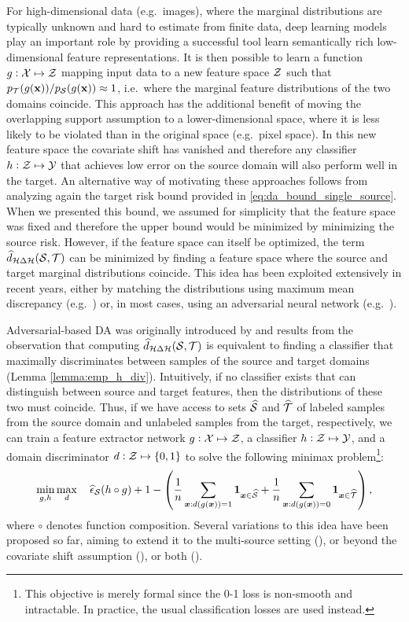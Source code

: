 For high-dimensional data (e.g.\ images), where the marginal distributions are typically unknown and hard to estimate from finite data, deep learning models play an important role by providing a successful tool learn semantically rich low-dimensional feature representations. It is then possible to learn a function $g:{\mathcal{X}} \mapsto {\mathcal{Z}}$ mapping input data to a new feature space ${\mathcal{Z}}$ such that $p_{{\mathcal{T}}}(g({\mathbf{x}}))/p_{{\mathcal{S}}}(g({\mathbf{x}})) \approx 1$, i.e.\ where the marginal feature distributions of the two domains coincide. This approach has the additional benefit of moving the overlapping support assumption to a lower-dimensional space, where it is less likely to be violated than in the original space (e.g.\ pixel space). In this new feature space the covariate shift has vanished and therefore any classifier $h:{\mathcal{Z}} \mapsto {\mathcal{Y}}$ that achieves low error on the source domain will also perform well in the target. An alternative way of motivating these approaches follows from analyzing again the target risk bound provided in \eqref{eq:da_bound_single_source}. When we presented this bound, we assumed for simplicity that the feature space was fixed and therefore the upper bound would be minimized by minimizing the source risk. However, if the feature space can itself be optimized, the term $\widehat{d}_{{\mathcal{H}} \Delta {\mathcal{H}}}({\mathcal{S}}, {\mathcal{T}})$ can be minimized by finding a feature space where the source and target marginal distributions coincide. This idea has been exploited extensively in recent years, either by matching the distributions using maximum mean discrepancy (e.g.\ \citet{Long2015,Guo2018}) or, in most cases, using an adversarial neural network (e.g.\ \citet{Zhao2018,Ganin2015,Pei2018,Sebag2019}).

Adversarial-based DA was originally introduced by \citet{Ganin2015} and results from the observation that
computing $\widehat{d}_{{\mathcal{H}} \Delta {\mathcal{H}}}({\mathcal{S}}, {\mathcal{T}})$ is equivalent to finding a classifier that maximally discriminates between samples of the source and target domains (Lemma \ref{lemma:emp_h_div}). Intuitively, if no classifier exists that can distinguish between source and target features, then the distributions of these two must coincide. Thus, if we have access to sets $\widehat{{\mathcal{S}}}$ and $\widehat{{\mathcal{T}}}$ of labeled samples from the source domain and unlabeled samples from the target, respectively, we can train a feature extractor network $g:{\mathcal{X}} \mapsto {\mathcal{Z}}$, a classifier $h:{\mathcal{Z}} \mapsto {\mathcal{Y}}$, and a domain discriminator $d:{\mathcal{Z}} \mapsto \{0,1\}$ to solve the following minimax problem\footnote{This objective is merely formal since the 0-1 loss is non-smooth and intractable. In practice, the usual classification losses are used instead.}:
\begin{equation}
	\label{eq:dann_obj}
	\min_{g,h} \max_d \quad \widehat{\epsilon}_{\mathcal{S}}(h \circ g) + 1 - \left(\frac{1}{n} \sum_{{\bm{x}}: d(g({\bm{x}}))=1} \bm{1}_{{\bm{x}} \in \widehat{{\mathcal{S}}}} + \frac{1}{n} \sum_{{\bm{x}}: d(g({\bm{x}}))=0} \bm{1}_{{\bm{x}} \in \widehat{{\mathcal{T}}}}\right),
\end{equation}
where $\circ$ denotes function composition. Several variations to this idea have been proposed so far, aiming to extend it to the multi-source setting (\citet{Zhao2018}), or beyond the covariate shift assumption (\citet{Pei2018}), or both (\citet{Sebag2019}).


